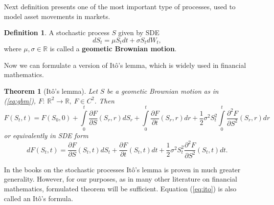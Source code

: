 \documentclass[a4paper,12pt, oneside]{book}
\newtheorem{thm}{Theorem}[chapter]
\theoremstyle{definition}
\newtheorem{mydef}{Definition}[chapter]
\theoremstyle{remark}
\def\R{{\mathbb{R}}}
\begin{document}
Next definition presents one of the most important type of processes, used to model asset movements in markets.
\begin{mydef}
 A stochastic process $S$ given by SDE
 \begin{equation}
  dS_t = \mu S_t dt + \sigma S_t dW_t, 
  \label{eq:gbm}
 \end{equation}
where $\mu,\sigma \in \R$ is called a \textbf{geometic Brownian motion}.
\end{mydef}

Now we can formulate a version of It\^{o}'s lemma, which is widely used in financial mathematics.
\begin{thm}[It\^{o}'s lemma]
 \label{thm:ito}
  Let $S$ be a geometic Brownian motion as in (\ref{eq:gbm}), $F:\ \R^2 \rightarrow \R,\ F \in C^2$. Then 
  \begin{equation*}
   F(S_t, t) = F(S_0, 0) + \int\limits_0^t \frac{\partial F}{\partial S}(S_r,r)dS_r + \int\limits_0^t \frac{\partial F}{\partial t}(S_r,r)dr + \frac{1}{2}\sigma^2 S_t^2 \int\limits_0^t \frac{\partial^2 F}{\partial S^2}(S_r,r)dr
  \end{equation*}
  or equivalently in SDE form
  \begin{equation}
   \label{eq:ito}
   dF(S_t, t) = \frac{\partial F}{\partial S}(S_t,t)dS_t + \frac{\partial F}{\partial t}(S_t,t)dt + \frac{1}{2}\sigma^2 S_t^2 \frac{\partial^2 F}{\partial S^2}(S_t,t)dt   .
  \end{equation}  
\end{thm}

\noindent In the books on the stochastic processes It\^{o}'s lemma is proven in much greater generality. However, for our purposes, as in many other literature on financial mathematics, formulated theorem will be sufficient.
Equation (\ref{eq:ito}) is also called an It\^{o}'s formula.
\end{document}
